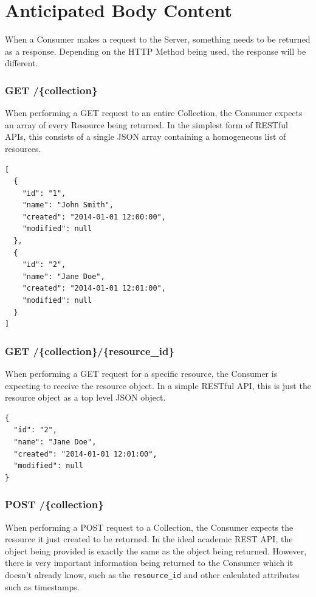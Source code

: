 \documentclass{book}
\begin{document}
\section{Anticipated Body Content}

When a Consumer makes a request to the Server, something needs to be returned as a response. Depending on the HTTP Method being used, the response will be different.

\subsubsection{GET /\{collection\}}

When performing a GET request to an entire Collection, the Consumer expects an array of every Resource being returned. In the simplest form of RESTful APIs, this consists of a single JSON array containing a homogeneous list of resources.

\begin{verbatim}
[
  {
    "id": "1",
    "name": "John Smith",
    "created": "2014-01-01 12:00:00",
    "modified": null
  },
  {
    "id": "2",
    "name": "Jane Doe",
    "created": "2014-01-01 12:01:00",
    "modified": null
  }
]
\end{verbatim}

\subsubsection{GET /\{collection\}/\{resource\_id\}}

When performing a GET request for a specific resource, the Consumer is expecting to receive the resource object. In a simple RESTful API, this is just the resource object as a top level JSON object.

\begin{verbatim}
{
  "id": "2",
  "name": "Jane Doe",
  "created": "2014-01-01 12:01:00",
  "modified": null
}
\end{verbatim}

\subsubsection{POST /\{collection\}}

When performing a POST request to a Collection, the Consumer expects the resource it just created to be returned. In the ideal academic REST API, the object being provided is exactly the same as the object being returned. However, there is very important information being returned to the Consumer which it doesn't already know, such as the \texttt{resource\_id} and other calculated attributes such as timestamps.
\end{document}
